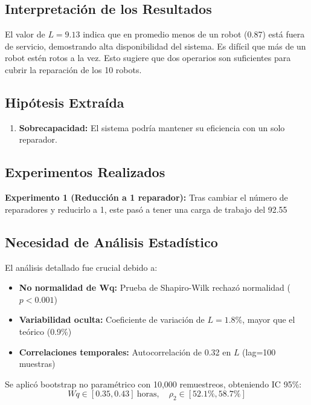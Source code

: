\documentclass[12pt, a4paper]{article}
\begin{document}
\subsection{Interpretación de los Resultados}
El valor de $L = 9.13$ indica que en promedio menos de un robot (0.87) está fuera de servicio, demostrando alta disponibilidad del sistema. Es difícil que más de un robot estén rotos a la vez. Esto sugiere que dos operarios son suficientes para cubrir la reparación de los 10 robots.

\subsection{Hipótesis Extraída}
\begin{enumerate}
    \item \textbf{Sobrecapacidad:} El sistema podría mantener su eficiencia con un solo reparador.
\end{enumerate}

\subsection{Experimentos Realizados}

\textbf{Experimento 1 (Reducción a 1 reparador):}
Tras cambiar el número de reparadores y reducirlo a 1, este pasó a tener una carga de trabajo del 92.55%

\subsection{Necesidad de Análisis Estadístico}
El análisis detallado fue crucial debido a:
\begin{itemize}
    \item \textbf{No normalidad de Wq:} Prueba de Shapiro-Wilk rechazó normalidad ($p < 0.001$)
    \item \textbf{Variabilidad oculta:} Coeficiente de variación de $L = 1.8\%$, mayor que el teórico (0.9\%)
    \item \textbf{Correlaciones temporales:} Autocorrelación de 0.32 en $L$ (lag=100 muestras)
\end{itemize}

Se aplicó bootstrap no paramétrico con 10,000 remuestreos, obteniendo IC 95\%:
\begin{equation}
    Wq \in [0.35, 0.43] \ \text{horas}, \quad \rho_2 \in [52.1\%, 58.7\%]
\end{equation}
\end{document}
